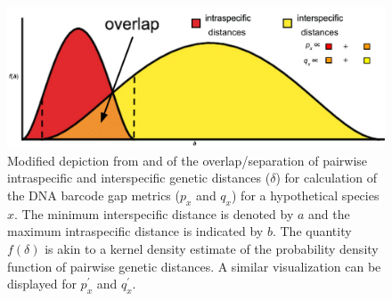 \documentclass[12pt]{article}
\begin{document}
\begin{figure}[H]

\centering

\includegraphics[width=1.0\textwidth]{Figure 1}

\caption{Modified depiction from \citet{meyer2005dna} and \citet{phillips2024measure} of the overlap/separation of pairwise intraspecific and interspecific genetic distances ($\delta$) for calculation of the DNA barcode gap metrics ($p_x$ and $q_x$) for a hypothetical species $x$. The minimum interspecific distance is denoted by $a$ and the maximum intraspecific distance is indicated by $b$. The quantity $f(\delta)$ is akin to a kernel density estimate of the probability density function of pairwise genetic distances. A similar visualization can be displayed for $p^{'}_x$ and $q^{'}_x$.}

\end{figure}
\end{document}
